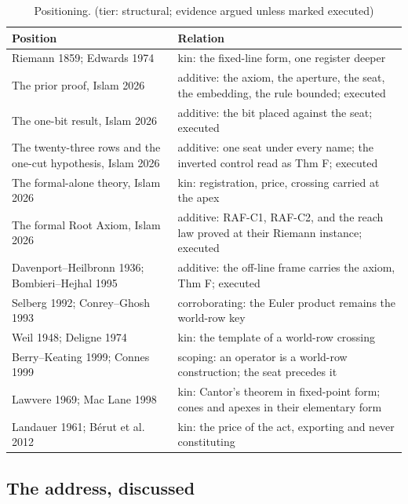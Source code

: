 \documentclass[10pt]{article}
\begin{document}
\begin{table}[t]
\footnotesize
\caption{Positioning. (tier: structural; evidence argued unless marked executed)}
\begin{tabular}{@{}p{}p{}@{}}
\toprule
Position & Relation \\
\midrule
Riemann 1859; Edwards 1974 & kin: the fixed-line form, one register deeper \\
The prior proof, Islam 2026 \cite{islamspine} & additive: the axiom, the aperture, the seat, the embedding, the rule bounded; executed \\
The one-bit result, Islam 2026 \cite{islamonebit} & additive: the bit placed against the seat; executed \\
The twenty-three rows and the one-cut hypothesis, Islam 2026 \cite{islamrows} & additive: one seat under every name; the inverted control read as Thm F; executed \\
The formal-alone theory, Islam 2026 \cite{islamftoe} & kin: registration, price, crossing carried at the apex \\
The formal Root Axiom, Islam 2026 \cite{islamraf} & additive: RAF-C1, RAF-C2, and the reach law proved at their Riemann instance; executed \\
Davenport--Heilbronn 1936; Bombieri--Hejhal 1995 & additive: the off-line frame carries the axiom, Thm F; executed \\
Selberg 1992; Conrey--Ghosh 1993 & corroborating: the Euler product remains the world-row key \\
Weil 1948; Deligne 1974 & kin: the template of a world-row crossing \\
Berry--Keating 1999; Connes 1999 & scoping: an operator is a world-row construction; the seat precedes it \\
Lawvere 1969; Mac Lane 1998 & kin: Cantor's theorem in fixed-point form; cones and apexes in their elementary form \\
Landauer 1961; B\'erut et al. 2012 & kin: the price of the act, exporting and never constituting \\
\bottomrule
\end{tabular}
\end{table}

\hypertarget{the-address-discussed}{%
\subsection{The address, discussed}\label{the-address-discussed}}
\end{document}

